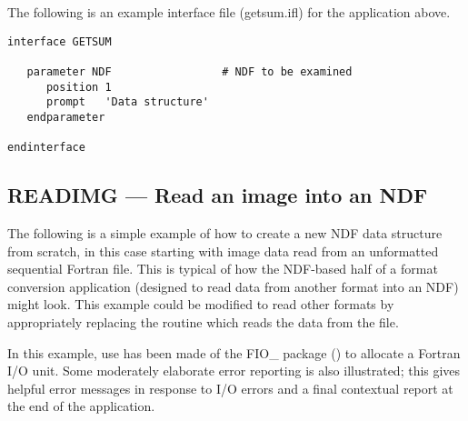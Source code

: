 The following is an example  interface file
(getsum.ifl) for the application above.

\small
\begin{verbatim}
interface GETSUM

   parameter NDF                 # NDF to be examined
      position 1
      prompt   'Data structure'
   endparameter

endinterface
\end{verbatim}
\normalsize

\newpage
\subsection{READIMG --- Read an image into an NDF}

The following is a simple example of how to create a new NDF data
structure from scratch, in this case starting with image data read
from an unformatted sequential Fortran file. This is typical of how
the NDF-based half of a format conversion application (designed to
read data from another format into an NDF) might look. This example
could be modified to read other formats by appropriately replacing the
routine which reads the data from the file.

In this example, use has been made of the FIO\_ package
() to allocate a Fortran I/O unit. Some
moderately elaborate error reporting is also illustrated; this gives
helpful error messages in response to I/O errors and a final
contextual report at the end of the application.

